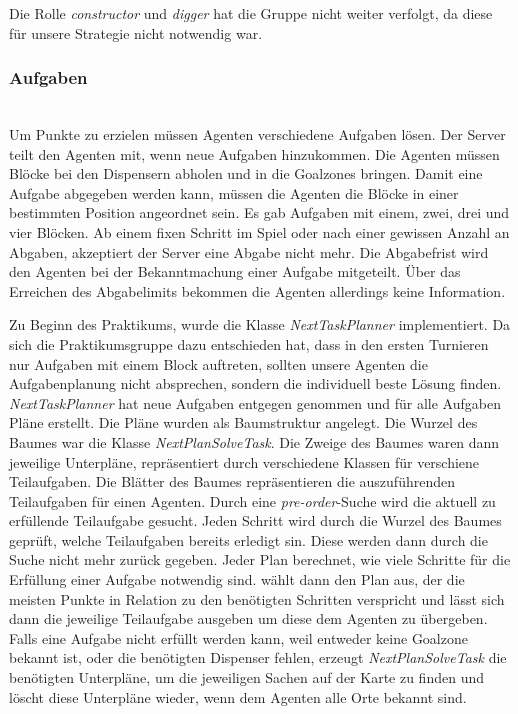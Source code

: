 Die Rolle \textit{constructor} und \textit{digger} hat die Gruppe nicht weiter verfolgt, da diese für unsere Strategie nicht notwendig war. 

\subsubsection{Aufgaben} ~\\
Um Punkte zu erzielen müssen Agenten verschiedene Aufgaben lösen. Der Server teilt den Agenten mit, wenn neue Aufgaben hinzukommen. Die Agenten müssen Blöcke bei den Dispensern abholen und in die Goalzones bringen. Damit eine Aufgabe abgegeben werden kann, müssen die Agenten die Blöcke in einer bestimmten Position angeordnet sein. Es gab Aufgaben mit einem, zwei, drei und vier Blöcken. Ab einem fixen Schritt im Spiel oder nach einer gewissen Anzahl an Abgaben, akzeptiert der Server eine Abgabe nicht mehr. Die Abgabefrist wird den Agenten bei der Bekanntmachung einer Aufgabe mitgeteilt. Über das Erreichen des Abgabelimits bekommen die Agenten allerdings keine Information.

Zu Beginn des Praktikums, wurde die Klasse \emph{NextTaskPlanner} implementiert. Da sich die Praktikumsgruppe dazu entschieden hat, dass in den ersten Turnieren nur Aufgaben mit einem Block auftreten, sollten unsere Agenten die Aufgabenplanung nicht absprechen, sondern die individuell beste Lösung finden. \emph{NextTaskPlanner} hat neue Aufgaben entgegen genommen und für alle Aufgaben Pläne erstellt.
Die Pläne wurden als Baumstruktur angelegt. Die Wurzel des Baumes war die Klasse \emph{NextPlanSolveTask}. Die Zweige des Baumes waren dann jeweilige Unterpläne, repräsentiert durch verschiedene Klassen für verschiene Teilaufgaben. Die Blätter des Baumes repräsentieren die auszuführenden Teilaufgaben für einen Agenten. Durch eine \emph{pre-order}-Suche wird die aktuell zu erfüllende Teilaufgabe gesucht. Jeden Schritt wird durch die Wurzel des Baumes geprüft, welche Teilaufgaben bereits erledigt sin. Diese werden dann durch die Suche nicht mehr zurück gegeben.
Jeder Plan berechnet, wie viele Schritte für die Erfüllung einer Aufgabe notwendig sind.  wählt dann den Plan aus, der die meisten Punkte in Relation zu den benötigten Schritten verspricht und lässt sich dann die jeweilige Teilaufgabe ausgeben um diese dem Agenten zu übergeben.
Falls eine Aufgabe nicht erfüllt werden kann, weil entweder keine Goalzone bekannt ist, oder die benötigten Dispenser fehlen, erzeugt \emph{NextPlanSolveTask} die benötigten Unterpläne, um die jeweiligen Sachen auf der Karte zu finden und löscht diese Unterpläne wieder, wenn dem Agenten alle Orte bekannt sind.

